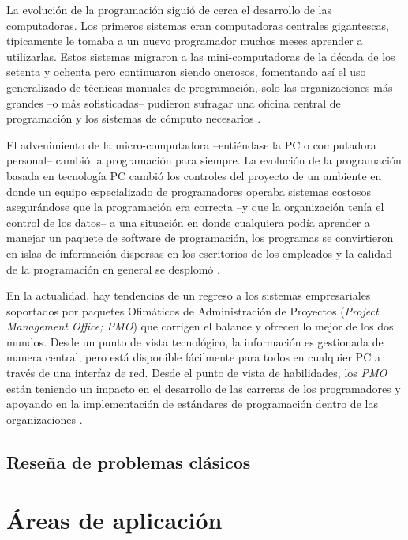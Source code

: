 \documentclass[draft,12pt,headsepline,footsepline,paper=letter]{scrreprt}
\begin{document}
La evolución de la programación siguió de cerca el desarrollo de las computadoras. Los primeros sistemas eran computadoras centrales gigantescas, típicamente le tomaba a un nuevo programador muchos meses aprender a utilizarlas. Estos sistemas migraron a las mini-computadoras de la década de los setenta y ochenta pero continuaron siendo onerosos, fomentando así el uso generalizado de técnicas manuales de programación, solo las organizaciones más grandes –o más sofisticadas– pudieron sufragar una oficina central de programación y los sistemas de cómputo necesarios \citep[p.~2]{Weaver2006}.

El advenimiento de la micro-computadora –entiéndase la PC o computadora personal– cambió la programación para siempre. La evolución de la programación basada en tecnología PC cambió los controles del proyecto de un ambiente en donde un equipo especializado de programadores operaba sistemas costosos asegurándose que la programación era correcta –y que la organización tenía el control de los datos– a una situación en donde cualquiera podía aprender a manejar un paquete de software de programación, los programas se convirtieron en islas de información dispersas en los escritorios de los empleados y la calidad de la programación en general se desplomó \citep[p.~2]{Weaver2006}.

En la actualidad, hay tendencias de un regreso a los sistemas empresariales soportados por paquetes Ofimáticos de Administración de Proyectos (\textit{Project Management Office; PMO}) que corrigen el balance y ofrecen lo mejor de los dos mundos. Desde un punto de vista tecnológico, la información es gestionada de manera central, pero está disponible fácilmente para todos en cualquier PC a través de una interfaz de red. Desde el punto de vista de habilidades, los \textit{PMO} están teniendo un impacto en el desarrollo de las carreras de los programadores y apoyando en la implementación de estándares de programación dentro de las organizaciones \citep[p.~2]{Weaver2006}.

\subsection{Reseña de problemas clásicos}
\label{resena_problemas_clasicos}

\section{Áreas de aplicación}
\label{areas_aplicacion}
\end{document}
